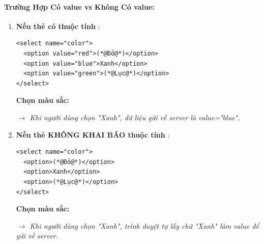 \paragraph{Trường Hợp Có value vs Không Có value:}
\begin{enumerate}[leftmargin=1.5em, itemsep=4pt, parsep=0pt]
    \item \textbf{Nếu thẻ có thuộc tính }:
    \begin{codeWindow}
\begin{lstlisting}[language=HTML5]
<select name="color">
  <option value="red">(*@Đỏ@*)</option>
  <option value="blue">Xanh</option>
  <option value="green">(*@Lục@*)</option>
</select>
\end{lstlisting}
    \end{codeWindow}

    \begin{browserWindow}
    \sffamily\small
    \textbf{Chọn màu sắc:} \par\vspace{4pt}
    \tcbox[on line, arc=3pt, colback=white, colframe=primaryBlue!50, boxsep=3pt, left=8pt, right=20pt, top=3pt, bottom=3pt]{%
      \small \textcolor{black}{Xanh} \;\; \textcolor{primaryBlue}{\textbf{$\boldsymbol{\vee}$}}%
    } \par\vspace{4pt}
    \textcolor{codeComment}{\small\textit{$\rightarrow$ Khi người dùng chọn "Xanh", dữ liệu gửi về server là value="blue".}}
    \end{browserWindow}

    \item \textbf{Nếu thẻ KHÔNG KHAI BÁO thuộc tính }:
    \begin{codeWindow}
\begin{lstlisting}[language=HTML5]
<select name="color">
  <option>(*@Đỏ@*)</option>
  <option>Xanh</option>
  <option>(*@Lục@*)</option>
</select>
\end{lstlisting}
    \end{codeWindow}

    \begin{browserWindow}
    \sffamily\small
    \textbf{Chọn màu sắc:} \par\vspace{4pt}
    \tcbox[on line, arc=3pt, colback=white, colframe=primaryBlue!50, boxsep=3pt, left=8pt, right=20pt, top=3pt, bottom=3pt]{%
      \small \textcolor{black}{Xanh} \;\; \textcolor{primaryBlue}{\textbf{$\boldsymbol{\vee}$}}%
    } \par\vspace{4pt}
    \textcolor{codeComment}{\small\textit{$\rightarrow$ Khi người dùng chọn "Xanh", trình duyệt tự lấy chữ "Xanh" làm value để gửi về server.}}
    \end{browserWindow}
\end{enumerate}

